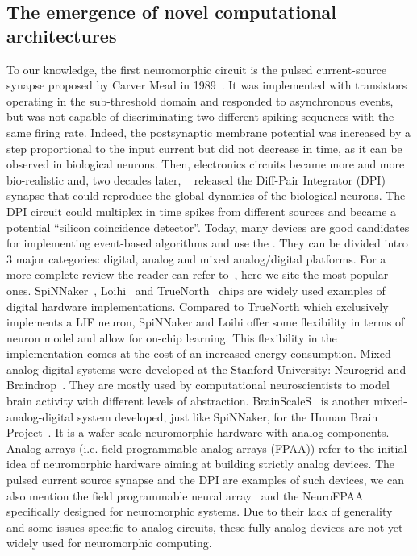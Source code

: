 \documentclass[brainsci, %
               review,submit,pdftex,moreauthors
               ]{Definitions/mdpi}
\begin{document}
\subsection{The emergence of novel computational architectures}
%
To our knowledge, the first neuromorphic circuit is the pulsed current-source synapse proposed by Carver Mead in 1989~\citep{mead_analog_1989}. It was implemented with transistors operating in the sub-threshold domain and responded to asynchronous events, but was not capable of discriminating two different spiking sequences with the same firing rate. Indeed, the postsynaptic membrane potential was increased by a step proportional to the input current but did not decrease in time, as it can be observed in biological neurons. Then, electronics circuits became more and more bio-realistic and, two decades later, ~\citep{bartolozzi_synaptic_2007} released the Diff-Pair Integrator (DPI) synapse that could reproduce the global dynamics of the biological neurons. The DPI circuit could multiplex in time spikes from different sources and became a potential  ``silicon coincidence detector''. Today, many devices are good candidates for implementing event-based algorithms and use the . They can be divided intro 3 major categories: digital, analog and mixed analog/digital platforms. For a more complete review the reader can refer to~\citep{schuman_survey_2017}, here we site the most popular ones. SpiNNaker~\citep{furber_overview_2013, furber_spinnaker_2020}, Loihi~\citep{davies_loihi_2018} and TrueNorth~\citep{merolla_million_2014} chips are widely used examples of digital hardware implementations. Compared to TrueNorth which exclusively implements a LIF neuron, SpiNNaker and Loihi offer some flexibility in terms of neuron model and allow for on-chip learning. This flexibility in the implementation comes at the cost of an increased energy consumption. Mixed-analog-digital systems were developed at the Stanford University: Neurogrid and Braindrop~\citep{benjamin_neurogrid_2014, neckar_braindrop_2019}. They are mostly used by computational neuroscientists to model brain activity with different levels of abstraction. BrainScaleS~\citep{schemmel_wafer-scale_2010} is another mixed-analog-digital system developed, just like SpiNNaker, for the Human Brain Project~\citep{markram_introducing_2011}. It is a wafer-scale neuromorphic hardware with analog components. Analog arrays (i.e. field programmable analog arrays (FPAA)) refer to the initial idea of neuromorphic hardware aiming at building strictly analog devices. The pulsed current source synapse and the DPI are examples of such devices, we can also mention the field programmable neural array~\citep{farquhar_field_2006} and the NeuroFPAA~\citep{cheng_fpaa_2009} specifically designed for neuromorphic systems. Due to their lack of generality and some issues specific to analog circuits, these fully analog devices are not yet widely used for neuromorphic computing. 
%
\end{document}
